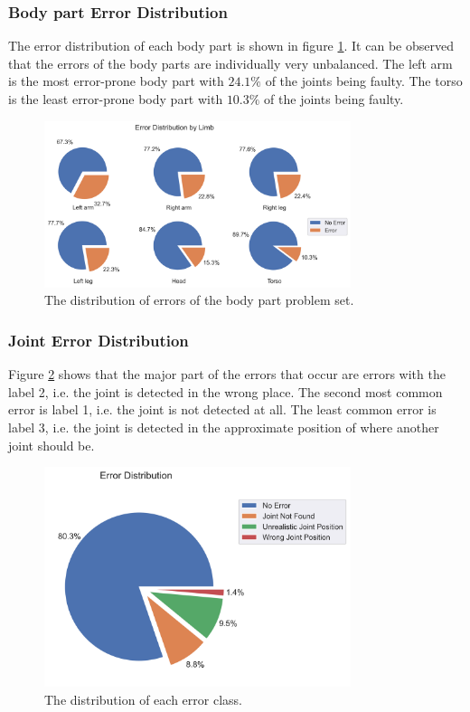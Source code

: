 \subsubsection{Body part Error Distribution}

The error distribution of each body part is shown in figure \ref{fig:lb_pie}. It can be observed that the errors of the body parts are individually very unbalanced. The left arm is the most error-prone body part with $24.1\%$ of the joints being faulty. The torso is the least error-prone body part with $10.3\%$ of the joints being faulty.

\begin{figure}[ht]
  \centering
  \includegraphics[width=0.8\textwidth]{figures/Data/dist_limbs/Error_Distribution_by_Limb.png}
  \caption[Error Distribution by Body part]{The distribution of errors of the body part problem set.}
  \label{fig:lb_pie}
\end{figure}

\subsubsection{Joint Error Distribution}

Figure \ref{fig:jt_pie} shows that the major part of the errors that occur are errors with the label 2, i.e. the joint is detected in the wrong place. The second most common error is label 1, i.e. the joint is not detected at all. The least common error is label 3, i.e. the joint is detected in the approximate position of where another joint should be.

\begin{figure}[ht]
  \centering
  \includegraphics[width=0.8\textwidth]{figures/Data/dist_joints/Error_Distribution.png}
  \caption[Error Distribution for each error class]{The distribution of each error class.}
  \label{fig:jt_pie}
\end{figure}

